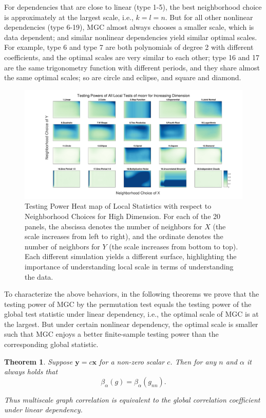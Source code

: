 \documentclass[11pt]{article}
\providecommand{\mb}[1]{\boldsymbol{#1}}
\newtheorem{thm}{Theorem}
\begin{document}
For dependencies that are close to linear (type 1-5), the best neighborhood choice is approximately at the largest scale, i.e., $k=l=n$. But for all other nonlinear dependencies (type 6-19), MGC almost always chooses a smaller scale, which is data dependent; and similar nonlinear dependencies yield similar optimal scales. For example, type 6 and type 7 are both polynomials of degree 2 with different coefficients, and the optimal scales are very similar to each other; type 16 and 17 are the same trigonometry function with different periods, and they share almost the same optimal scales; so are circle and eclipse, and square and diamond.

\begin{figure}[htbp]
\includegraphics[width=1.0\textwidth]{../Figures/Fig6}
\caption{Testing Power Heat map of Local Statistics with respect to Neighborhood Choices for High Dimension.
For each of the 20 panels, the abscissa denotes the number of neighbors for $X$ (the scale increases from left to right), and the ordinate denotes the number of neighbors for $Y$ (the scale increases from bottom to top).  Each different simulation yields a different surface, highlighting the importance of understanding local scale in terms of understanding the data.}
\label{figSim6}
\end{figure}

To characterize the above behaviors, in the following theorems we prove that the testing power of MGC by the permutation test equals the testing power of the global test statistic under linear dependency, i.e., the optimal scale of MGC is at the largest. But under certain nonlinear dependency, the optimal scale is smaller such that MGC enjoys a better finite-sample testing power than the corresponding global statistic. 

\begin{thm}
\label{thm2}
Suppose $\mb{y}=c\mb{x}$ for a non-zero scalar $c$. Then for any $n$ and $\alpha$ it always holds that
\begin{equation}
\beta_{\alpha}(g) = \beta_{\alpha}(g_{nn}).
\end{equation}

Thus multiscale graph correlation is equivalent to the global correlation coefficient under linear dependency.
\end{thm}
\end{document}
